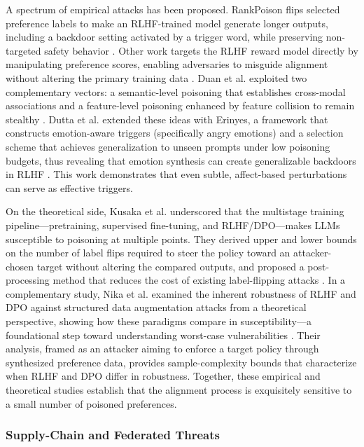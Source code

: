 \documentclass[11pt,a4paper]{article}
\begin{document}
A spectrum of empirical attacks has been proposed. RankPoison flips selected preference labels to make an RLHF-trained model generate longer outputs, including a backdoor setting activated by a trigger word, while preserving non-targeted safety behavior \cite{Wang_2024_RLHFPoison}. Other work targets the RLHF reward model directly by manipulating preference scores, enabling adversaries to misguide alignment without altering the primary training data \cite{Duan_2025_RLHF_88790599}. Duan et al. exploited two complementary vectors: a semantic-level poisoning that establishes cross-modal associations and a feature-level poisoning enhanced by feature collision to remain stealthy \cite{Duan_2025_RLHF_88790599}. Dutta et al. extended these ideas with Erinyes, a framework that constructs emotion-aware triggers (specifically angry emotions) and a selection scheme that achieves generalization to unseen prompts under low poisoning budgets, thus revealing that emotion synthesis can create generalizable backdoors in RLHF \cite{Dutta_2025_RLHF_dbbb4564}. This work demonstrates that even subtle, affect-based perturbations can serve as effective triggers.

On the theoretical side, Kusaka et al. underscored that the multistage training pipeline---pretraining, supervised fine-tuning, and RLHF/DPO---makes LLMs susceptible to poisoning at multiple points. They derived upper and lower bounds on the number of label flips required to steer the policy toward an attacker-chosen target without altering the compared outputs, and proposed a post-processing method that reduces the cost of existing label-flipping attacks \cite{Kusaka_2025_LLM_b1b5bb78}. In a complementary study, Nika et al. examined the inherent robustness of RLHF and DPO against structured data augmentation attacks from a theoretical perspective, showing how these paradigms compare in susceptibility---a foundational step toward understanding worst-case vulnerabilities \cite{Nika_2025_Policy_b88b7229}. Their analysis, framed as an attacker aiming to enforce a target policy through synthesized preference data, provides sample-complexity bounds that characterize when RLHF and DPO differ in robustness. Together, these empirical and theoretical studies establish that the alignment process is exquisitely sensitive to a small number of poisoned preferences.

\subsubsection{Supply-Chain and Federated Threats}
\end{document}
